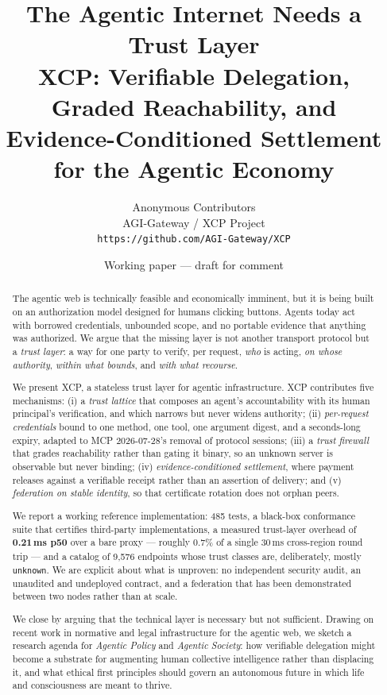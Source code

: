 \documentclass[11pt]{article}
\title{\textbf{The Agentic Internet Needs a Trust Layer}\\[0.3em]
\large XCP: Verifiable Delegation, Graded Reachability, and
Evidence-Conditioned Settlement for the Agentic Economy}
\author{Anonymous Contributors\\
\small AGI-Gateway / XCP Project\\
\small \texttt{https://github.com/AGI-Gateway/XCP}}
\date{Working paper --- draft for comment}
\begin{document}
\maketitle

\begin{abstract}
The agentic web is technically feasible and economically imminent, but it is
being built on an authorization model designed for humans clicking buttons.
Agents today act with borrowed credentials, unbounded scope, and no portable
evidence that anything was authorized. We argue that the missing layer is not
another transport protocol but a \emph{trust layer}: a way for one party to
verify, per request, \emph{who} is acting, \emph{on whose authority},
\emph{within what bounds}, and \emph{with what recourse}.

We present XCP, a stateless trust layer for agentic infrastructure. XCP
contributes five mechanisms: (i) a \emph{trust lattice} that composes an agent's
accountability with its human principal's verification, and which narrows but
never widens authority; (ii) \emph{per-request credentials} bound to one method,
one tool, one argument digest, and a seconds-long expiry, adapted to MCP
2026-07-28's removal of protocol sessions; (iii) a \emph{trust firewall} that
grades reachability rather than gating it binary, so an unknown server is
observable but never binding; (iv) \emph{evidence-conditioned settlement}, where
payment releases against a verifiable receipt rather than an assertion of
delivery; and (v) \emph{federation on stable identity}, so that certificate
rotation does not orphan peers.

We report a working reference implementation: 485 tests, a black-box conformance
suite that certifies third-party implementations, a measured trust-layer overhead
of \textbf{0.21\,ms p50} over a bare proxy --- roughly $0.7\%$ of a single
$30$\,ms cross-region round trip --- and a catalog of 9{,}576 endpoints whose
trust classes are, deliberately, mostly \texttt{unknown}. We are explicit about
what is unproven: no independent security audit, an unaudited and undeployed
contract, and a federation that has been demonstrated between two nodes rather
than at scale.

We close by arguing that the technical layer is necessary but not sufficient.
Drawing on recent work in normative and legal infrastructure for the agentic web,
we sketch a research agenda for \emph{Agentic Policy} and \emph{Agentic Society}:
how verifiable delegation might become a substrate for augmenting human
collective intelligence rather than displacing it, and what ethical first
principles should govern an autonomous future in which life and consciousness are
meant to thrive.
\end{abstract}
\end{document}
